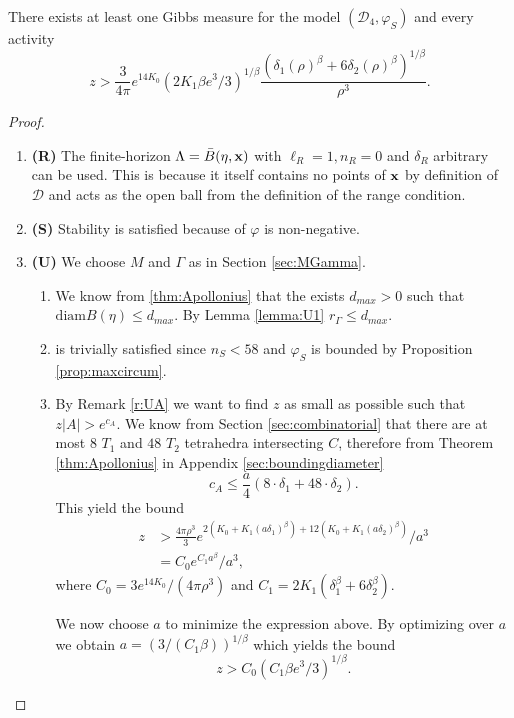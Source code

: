 \begin{theorem}\label{thm:E1}
	There exists at least one Gibbs measure for the model $(\mathcal D_4,\varphi_S)$ and every activity 
	$$z> \frac{3}{4\pi}e^{14 K_0}   (2K_1 \beta e^3/3)^{1/\beta} \frac{(\delta_1(\rho)^\beta + 6\delta_2(\rho)^\beta)^{1/\beta}}{\rho^3}.$$
\end{theorem}
\begin{proof}
\begin{enumerate}[]
	\item \textbf{(R)} The finite-horizon $\Lambda = \bar B(\eta,{\mathbf{x}})$ with $\ell_R = 1, n_R = 0$ and $\delta_R$ arbitrary can be used. This is because it itself contains no points of ${\mathbf{x}}$ by definition of $\mathcal D$ and acts as the open ball from the definition of the range condition.
	\item \textbf{(S)} Stability is satisfied because of $\varphi$ is non-negative.
	\item \textbf{(U)} We choose $M$ and $\Gamma$ as in Section \ref{sec:MGamma}.
		\begin{enumerate}[(U1)]
			\item We know from \ref{thm:Apollonius} that the exists $d_{max}>0$ such that $\text{diam}B(\eta)\leq d_{max}$. By Lemma \ref{lemma:U1} $r_\Gamma\leq d_{max}.$
			\item is trivially satisfied since $n_S < 58$ and $\varphi_S$ is bounded by Proposition \ref{prop:maxcircum}.
			\item By Remark \ref{r:UA} we want to find $z$ as small as possible such that $z|A|>e^{c_A}.$ We know from Section \ref{sec:combinatorial} that there are at most $8$ $T_1$ and $48$ $T_2$ tetrahedra intersecting $C$, therefore from Theorem \ref{thm:Apollonius} in Appendix \ref{sec:boundingdiameter}
				$$c_A \leq \frac a4 (8\cdot \delta_1 + 48\cdot \delta_2 ).$$
				This yield the bound
				\begin{align*}z &> \frac{4\pi\rho^3}{3} e^{2(K_0 + K_1 (a\delta_1)^\beta) + 12(K_0 + K_1(a \delta_2)^\beta)} / a^3  \\
					&= C_0 e^{C_1 a^\beta} / a^3,  
				\end{align*}
				where $C_0 = 3e^{14K_0}/(4\pi \rho^3)$ and $C_1 = 2K_1(\delta_1^\beta + 6 \delta_2^\beta)$.

				We now choose $a$ to minimize the expression above. By optimizing over $a$ we obtain $a=(3/(C_1 \beta))^{1/\beta}$ which yields the bound 
				$$z> C_0(C_1 \beta e^3/ 3 )^{1/\beta}.$$
		\end{enumerate}
\end{enumerate}
\end{proof}



